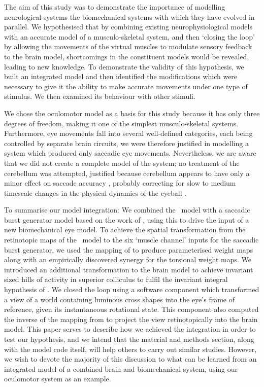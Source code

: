 The aim of this study was to demonstrate the importance of modelling
neurological systems  the biomechanical systems
with which they have evolved in parallel. We hypothesised that by combining
existing neurophysiological models with an accurate
model of a musculo-skeletal system, and then `closing the loop' by allowing
the movements of the virtual muscles to modulate sensory feedback to
the brain model, shortcomings in the constituent models would be
revealed, leading to new knowledge. To demonstrate the validity
of this hypothesis, we built an integrated model and then identified the
modifications which were necessary to give it the ability to make
accurate movements under one type of stimulus. We then
examined its behaviour with other stimuli.

We chose the oculomotor model as a basis for this study because it has
only three degrees of freedom, making it one of the simplest
musculo-skeletal systems. Furthermore, eye movements fall into several
well-defined categories, each being controlled by separate
brain circuits, we were therefore justified in modelling a
system which produced only saccadic eye movements. Nevertheless, we are
aware that we did not create a complete model of the system; no treatment
of the cerebellum was attempted, justified because cerebellum appears to have
only a minor effect on saccade accuracy \citep{dean_adaptive_2008}, probably correcting
for slow to medium timescale changes in the physical dynamics of the
eyeball \citep{dean_learning_1994}.

To summarise our model integration: We combined
the \ccg~model \citep{cope_basal_2017} with a saccadic burst generator
model based on the work of \cite{gancarz_neural_1998}, using this to
drive the input of a new biomechanical eye model. To achieve the spatial
transformation from the retinotopic maps of the \ccg~model to the six
`muscle channel' inputs for the saccadic burst generator, we used
the mapping of \cite{ottes_visuomotor_1986} to produce parameterised
weight maps along with an empirically discovered synergy for the torsional
weight maps. We introduced an additional
transformation to the brain model to achieve invariant sized hills of
activity in superior colliculus to fulfil the invariant integral
hypothesis of \cite{tabareau_geometry_2007}. We closed the loop using
a software component which transformed a view of a world containing
luminous cross shapes into the eye's frame of reference, given its
instantaneous rotational state. This component also computed the inverse
of the mapping from \cite{ottes_visuomotor_1986} to project the view
retinotopically into the brain model.
%
This paper serves to describe how we achieved the integration in
order to test our hypothesis, and we intend that the material and
methods section, along with the model code itself, will help others
to carry out similar studies. However, we wish to devote the majority
of this discussion to what can be learned from an integrated model
of a combined brain and biomechanical system, using our oculomotor system
as an example.

